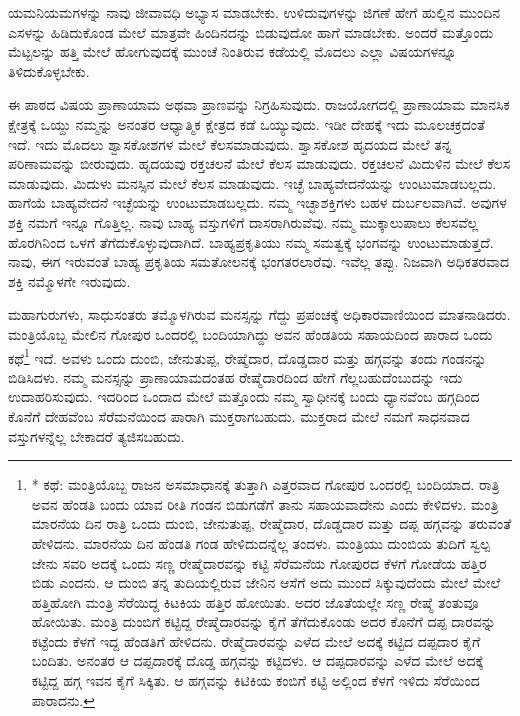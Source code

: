 ಯಮನಿಯಮಗಳನ್ನು ನಾವು ಜೀವಾವಧಿ ಅಭ್ಯಾಸ ಮಾಡಬೇಕು. ಉಳಿದುವುಗಳನ್ನು ಜಿಗಣೆ ಹೇಗೆ ಹುಲ್ಲಿನ ಮುಂದಿನ ಎಸಳನ್ನು ಹಿಡಿದುಕೊಂಡ ಮೇಲೆ ಮಾತ್ರವೇ ಹಿಂದಿನದನ್ನು ಬಿಡುವುದೋ ಹಾಗೆ ಮಾಡಬೇಕು. ಅಂದರೆ ಮತ್ತೊಂದು ಮೆಟ್ಟಲನ್ನು ಹತ್ತಿ ಮೇಲೆ ಹೋಗುವುದಕ್ಕೆ ಮುಂಚೆ ನಿಂತಿರುವ ಕಡೆಯಲ್ಲಿ ಮೊದಲು ಎಲ್ಲಾ ವಿಷಯಗಳನ್ನೂ ತಿಳಿದುಕೊಳ್ಳಬೇಕು.

ಈ ಪಾಠದ ವಿಷಯ ಪ್ರಾಣಾಯಾಮ ಅಥವಾ ಪ್ರಾಣವನ್ನು ನಿಗ್ರಹಿಸುವುದು. ರಾಜಯೋಗದಲ್ಲಿ ಪ್ರಾಣಾಯಾಮ ಮಾನಸಿಕ ಕ್ಷೇತ್ರಕ್ಕೆ ಒಯ್ದು ನಮ್ಮನ್ನು ಅನಂತರ ಆಧ್ಯಾತ್ಮಿಕ ಕ್ಷೇತ್ರದ ಕಡೆ ಒಯ್ಯುವುದು. ಇಡೀ ದೇಹಕ್ಕೆ ಇದು ಮೂಲಚಕ್ರದಂತೆ ಇದೆ. ಇದು ಮೊದಲು ಶ್ವಾಸಕೋಶಗಳ ಮೇಲೆ ಕೆಲಸಮಾಡುವುದು. ಶ್ವಾಸಕೋಶ ಹೃದಯದ ಮೇಲೆ ತನ್ನ ಪರಿಣಾಮವನ್ನು ಬೀರುವುದು. ಹೃದಯವು ರಕ್ತಚಲನೆ ಮೇಲೆ ಕೆಲಸ ಮಾಡುವುದು. ರಕ್ತಚಲನೆ ಮಿದುಳಿನ ಮೇಲೆ ಕೆಲಸ ಮಾಡುವುದು. ಮಿದುಳು ಮನಸ್ಸಿನ ಮೇಲೆ ಕೆಲಸ ಮಾಡುವುದು. ಇಚ್ಛೆ ಬಾಹ್ಯವೇದನೆಯನ್ನು ಉಂಟುಮಾಡಬಲ್ಲದು. ಹಾಗೆಯೆ ಬಾಹ್ಯವೇದನೆ ಇಚ್ಛೆಯನ್ನು ಉಂಟುಮಾಡಬಲ್ಲದು. ನಮ್ಮ ಇಚ್ಛಾಶಕ್ತಿಗಳು ಬಹಳ ದುರ್ಬಲವಾಗಿವೆ. ಅವುಗಳ ಶಕ್ತಿ ನಮಗೆ ಇನ್ನೂ ಗೊತ್ತಿಲ್ಲ. ನಾವು ಬಾಹ್ಯ ವಸ್ತುಗಳಿಗೆ ದಾಸರಾಗಿರುವೆವು. ನಮ್ಮ ಮುಕ್ಕಾಲುಪಾಲು ಕೆಲಸವೆಲ್ಲ ಹೊರಗಿನಿಂದ ಒಳಗೆ ತೆಗೆದುಕೊಳ್ಳುವುದಾಗಿದೆ. ಬಾಹ್ಯಪ್ರಕೃತಿಯು ನಮ್ಮ ಸಮತ್ವಕ್ಕೆ ಭಂಗವನ್ನು ಉಂಟುಮಾಡುತ್ತದೆ. ನಾವು, ಈಗ ಇರುವಂತೆ ಬಾಹ್ಯ ಪ್ರಕೃತಿಯ ಸಮತೋಲನಕ್ಕೆ ಭಂಗತರಲಾರೆವು. ಇವೆಲ್ಲ ತಪ್ಪು. ನಿಜವಾಗಿ ಅಧಿಕತರವಾದ ಶಕ್ತಿ ನಮ್ಮೊಳಗೇ ಇರುವುದು.

ಮಹಾಗುರುಗಳು, ಸಾಧುಸಂತರು ತಮ್ಮೊಳಗಿರುವ ಮನಸ್ಸನ್ನು ಗೆದ್ದು ಪ್ರಪಂಚಕ್ಕೆ ಅಧಿಕಾರವಾಣಿಯಿಂದ ಮಾತನಾಡಿದರು. ಮಂತ್ರಿಯೊಬ್ಬ ಮೇಲಿನ ಗೋಪುರ ಒಂದರಲ್ಲಿ ಬಂದಿಯಾಗಿದ್ದು ಅವನ ಹೆಂಡತಿಯ ಸಹಾಯದಿಂದ ಪಾರಾದ ಒಂದು ಕಥೆ\footnote{* ಕಥೆ: ಮಂತ್ರಿಯೊಬ್ಬ ರಾಜನ ಅಸಮಾಧಾನಕ್ಕೆ ತುತ್ತಾಗಿ ಎತ್ತರವಾದ ಗೋಪುರ ಒಂದರಲ್ಲಿ ಬಂದಿಯಾದ. ರಾತ್ರಿ ಅವನ ಹೆಂಡತಿ ಬಂದು ಯಾವ ರೀತಿ ಗಂಡನ ಬಿಡುಗಡೆಗೆ ತಾನು ಸಹಾಯವಾದೇನು ಎಂದು ಕೇಳಿದಳು. ಮಂತ್ರಿ ಮಾರನೆಯ ದಿನ ರಾತ್ರಿ ಒಂದು ದುಂಬಿ, ಜೇನುತುಪ್ಪ, ರೇಷ್ಮೆದಾರ, ದೊಡ್ಡದಾರ ಮತ್ತು ದಪ್ಪ ಹಗ್ಗವನ್ನು ತರುವಂತೆ ಹೇಳಿದನು. ಮಾರನೆಯ ದಿನ ಹೆಂಡತಿ ಗಂಡ ಹೇಳಿದುದನ್ನೆಲ್ಲ ತಂದಳು. ಮಂತ್ರಿಯು ದುಂಬಿಯ ತುದಿಗೆ ಸ್ವಲ್ಪ ಜೇನು ಸವರಿ ಅದಕ್ಕೆ ಒಂದು ಸಣ್ಣ ರೇಷ್ಮೆದಾರವನ್ನು ಕಟ್ಟಿ ಸೆರೆಮನೆಯ ಗೋಪುರದ ಕೆಳಗೆ ಗೋಡೆಯ ಹತ್ತಿರ ಬಿಡು ಎಂದನು. ಆ ದುಂಬಿ ತನ್ನ ತುದಿಯಲ್ಲಿರುವ ಜೇನಿನ ಆಸೆಗೆ ಅದು ಮುಂದೆ ಸಿಕ್ಕುವುದೆಂದು ಮೇಲೆ ಮೇಲೆ ಹತ್ತಿಹೋಗಿ ಮಂತ್ರಿ ಸೆರೆಯಿದ್ದ ಕಿಟಕಿಯ ಹತ್ತಿರ ಹೋಯಿತು. ಅದರ ಜೊತೆಯಲ್ಲೇ ಸಣ್ಣ ರೇಷ್ಮೆ ತಂತುವೂ ಹೋಯಿತು. ಮಂತ್ರಿ ದುಂಬಿಗೆ ಕಟ್ಟಿದ್ದ ರೇಷ್ಮೆದಾರವನ್ನು ಕೈಗೆ ತೆಗೆದುಕೊಂಡು ಅದರ ಕೊನೆಗೆ ದಪ್ಪ ದಾರವನ್ನು ಕಟ್ಟೆಂದು ಕೆಳಗೆ ಇದ್ದ ಹೆಂಡತಿಗೆ ಹೇಳಿದನು. ರೇಷ್ಮೆದಾರವನ್ನು ಎಳೆದ ಮೇಲೆ ಅದಕ್ಕೆ ಕಟ್ಟಿದ ದಪ್ಪದಾರ ಕೈಗೆ ಬಂದಿತು. ಅನಂತರ ಆ ದಪ್ಪದಾರಕ್ಕೆ ದೊಡ್ಡ ಹಗ್ಗವನ್ನು ಕಟ್ಟಿದಳು. ಆ ದಪ್ಪದಾರವನ್ನು ಎಳೆದ ಮೇಲೆ ಅದಕ್ಕೆ ಕಟ್ಟಿದ್ದ ಹಗ್ಗ ಇವನ ಕೈಗೆ ಸಿಕ್ಕಿತು. ಆ ಹಗ್ಗವನ್ನು ಕಿಟಿಕಿಯ ಕಂಬಿಗೆ ಕಟ್ಟಿ ಅಲ್ಲಿಂದ ಕೆಳಗೆ ಇಳಿದು ಸೆರೆಯಿಂದ ಪಾರಾದನು.} ಇದೆ. ಅವಳು ಒಂದು ದುಂಬಿ, ಜೇನುತುಪ್ಪ, ರೇಷ್ಮೆದಾರ, ದೊಡ್ಡದಾರ ಮತ್ತು ಹಗ್ಗವನ್ನು ತಂದು ಗಂಡನನ್ನು ಬಿಡಿಸಿದಳು. ನಮ್ಮ ಮನಸ್ಸನ್ನು ಪ್ರಾಣಾಯಾಮದಂತಹ ರೇಷ್ಮೆದಾರದಿಂದ ಹೇಗೆ ಗೆಲ್ಲಬಹುದೆಂಬುದನ್ನು ಇದು ಉದಾಹರಿಸುವುದು. ಇದರಿಂದ ಒಂದಾದ ಮೇಲೆ ಮತ್ತೊಂದು ನಮ್ಮ ಸ್ವಾಧೀನಕ್ಕೆ ಬಂದು ಧ್ಯಾನವೆಂಬ ಹಗ್ಗದಿಂದ ಕೊನೆಗೆ ದೇಹವೆಂಬ ಸೆರೆಮನೆಯಿಂದ ಪಾರಾಗಿ ಮುಕ್ತರಾಗಬಹುದು. ಮುಕ್ತರಾದ ಮೇಲೆ ನಮಗೆ ಸಾಧನವಾದ ವಸ್ತುಗಳನ್ನೆಲ್ಲ ಬೇಕಾದರೆ ತ್ಯಜಿಸಬಹುದು.

